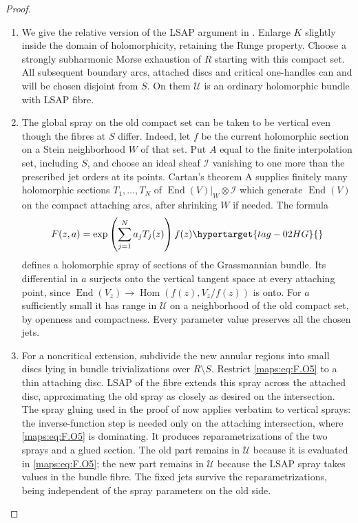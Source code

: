 \documentclass[11pt,a4paper]{article}
\numberwithin{equation}{section}
\theoremstyle{definition}
\begin{document}
\begin{proof}
\begin{enumerate}[label=\arabic*.]
\item We give the relative version of the LSAP argument
in \cite[arXiv v5, Lemma~5.1, p.~14; Theorem~6.1, p.~17; Proposition~7.13(d), p.~24]{IVVOkaOneV5}.    Enlarge $K$ slightly inside
the domain of holomorphicity, retaining the Runge property.
Choose a strongly subharmonic Morse exhaustion of $R$ starting
with this compact set.  All subsequent boundary arcs, attached
discs and critical one-handles can and will be chosen disjoint
from $S$.  On them $\mathscr U$ is an ordinary holomorphic
bundle with LSAP fibre.

\item The global spray on the old compact set can be taken to be
vertical even though the fibres at $S$ differ.  Indeed, let $f$
be the current holomorphic section on a Stein neighborhood $W$
of that set.  Put $A$ equal to the finite interpolation set,
including $S$, and choose an ideal sheaf $\mathcal I$ vanishing
to one more than the prescribed jet orders at its points.
Cartan's theorem A supplies finitely many holomorphic sections
$T_1,\ldots,T_N$ of
$\operatorname{End}(V)|_W\otimes\mathcal I$ which generate
$\operatorname{End}(V)$ on the compact attaching arcs, after
shrinking $W$ if needed.  The formula
\begin{equation}
 F(z,a)=\exp\left(\sum_{j=1}^N a_jT_j(z)\right)f(z)
 \hypertarget{tag-02HG}{}\label{maps:eq:F.O5}
\end{equation}
defines a holomorphic spray of sections of the Grassmannian
bundle.  Its differential in $a$ surjects onto the vertical
tangent space at every attaching point, since
$\operatorname{End}(V_z)\to
\operatorname{Hom}(f(z),V_z/f(z))$ is onto.
For $a$ sufficiently small it has range in $\mathscr U$ on
a neighborhood of the old compact set, by openness and
compactness.  Every parameter value preserves all the chosen
jets.  

\item For a noncritical extension, subdivide the new annular regions
into small discs lying in bundle trivializations over
$R\setminus S$.  Restrict \eqref{maps:eq:F.O5} to a thin attaching disc.
LSAP of the fibre extends this spray across the attached disc,
approximating the old spray as closely as desired on the
intersection.  The spray gluing used in the proof of
\cite[arXiv v5, Lemma~5.1, equations~(5.6)--(5.8), pp.~16--17]{IVVOkaOneV5} now applies verbatim to vertical sprays:
the inverse-function step is needed only on the attaching
intersection, where \eqref{maps:eq:F.O5} is dominating.  It produces
reparametrizations of the two sprays and a glued section.
The old part remains in $\mathscr U$ because it is evaluated
in \eqref{maps:eq:F.O5}; the new part remains in $\mathscr U$ because the
LSAP spray takes values in the bundle fibre.  The fixed jets
survive the reparametrizations, being independent of the
spray parameters on the old side.


\end{enumerate}
\end{proof}
\end{document}
